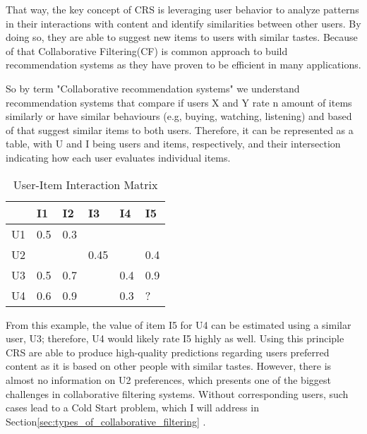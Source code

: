 \documentclass[10pt,a4paper]{article}
\begin{document}
\hspace{0.2cm}

That way, the key concept of CRS is leveraging user behavior to analyze patterns in their interactions with content and identify similarities between other users. By doing so, they are able to suggest new items to users with similar tastes. Because of that Collaborative Filtering(CF) is common approach to build recommendation systems as they have proven to be efficient in many applications.
\cite{kumar2015role}

\hspace{0.2cm}

So by term "Collaborative recommendation systems" we understand  recommendation systems that compare if users X and Y  rate n amount of items similarly or have similar behaviours (e.g, buying, watching, listening)  and based of that suggest similar items to both users\cite{10.1155/2009/421425}. Therefore, it can be represented as a table, with U and I being users and items, respectively, and their intersection indicating how each user evaluates individual items.

\hspace{0.2cm}

\begin{table}[h]
    \centering
    \begin{tabular}{ |C{1cm}|C{1cm}|C{1cm}|C{1cm}|C{1cm}|C{1cm}| }
    \hline
      & I1 & I2 & I3 & I4 & I5  \\ 
     \hline
     U1 & 0.5 & 0.3 &  &  &  \\  
     \hline
     U2 &  &  & 0.45 &  & 0.4 \\
     \hline
     U3 & 0.5 & 0.7 &  & 0.4 & 0.9 \\
     \hline
     U4 & 0.6 & 0.9 &  & 0.3 & ? \\
     \hline
    \end{tabular}
    \caption{User-Item Interaction Matrix} %
    \label{user-item-table} %
\end{table}

\hspace{0.2cm}

From this example, the value of item I5 for U4 can be estimated using a similar user, U3; therefore, U4 would likely rate I5 highly as well. Using this principle CRS are able to produce high-quality predictions regarding users preferred content as it is based on other people with similar tastes. However, there is almost no information on U2 preferences, which presents one of the biggest challenges in collaborative filtering systems. Without corresponding users, such cases lead to a Cold Start problem, which I will address in Section\ref{sec:types_of_collaborative_filtering} \cite{5283866}.
\end{document}
